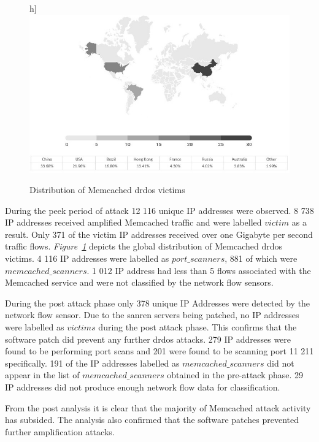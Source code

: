 \begin{figure}[]h]
    \centering
    \includegraphics[width=\columnwidth]{section_4/map_countries_memcahced.jpg}
    \caption{Distribution of Memcached \gls{drdos} victims}
    \label{fig:map}
\end{figure}

During the peek period of attack 12 116 unique IP addresses were observed. 8 738 IP addresses received amplified Memcached traffic and were labelled $victim$ as a result. Only 371 of the victim IP addresses received over one Gigabyte per second traffic flows. \textit{Figure~\ref{fig:map}} depicts the global distribution of Memcached \gls{drdos} victims. 4 116 IP addresses were labelled as $port\_scanners$, 881 of which were $memcached\_scanners$. 1 012 IP address had less than 5 flows associated with the Memcached service and were not classified by the network flow sensors.

During the post attack phase only 378 unique IP Addresses were detected by the network flow sensor. Due to the \gls{sanren} servers being patched, no IP addresses were labelled as $victims$ during the post attack phase. This confirms that the software patch did prevent any further \gls{drdos} attacks. 279 IP addresses were found to be performing port scans and 201 were found to be scanning port 11 211 specifically. 191 of the IP addresses labelled as $memcached\_scanners$ did not appear in the list of $memcached\_scanners$ obtained in the pre-attack phase. 29 IP addresses did not produce enough network flow data for classification.

From the post analysis it is clear that the majority of Memcached attack activity has subsided. The analysis also confirmed that the software patches prevented further amplification attacks.


